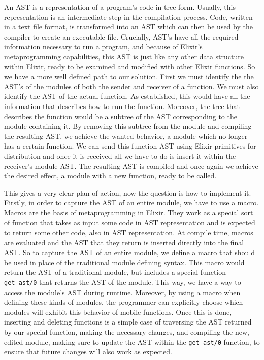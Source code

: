 An AST is a representation of a program's code in tree form. Usually, this representation is an intermediate step in the compilation process. Code, written in a text file format, is transformed into an AST which can then be used by the compiler to create an executable file. Crucially, AST's have all the required information necessary to run a program, and because of Elixir's metaprogramming capabilities, this AST is just like any other data structure within Elixir, ready to be examined and modified with other Elixir functions. So we have a more well defined path to our solution. First we must identify the the AST's of the modules of both the sender and receiver of a function. We must also identify the AST of the actual function. As established, this would have all the information that describes how to run the function. Moreover, the tree that describes the function would be a subtree of the AST corresponding to the module containing it. By removing this subtree from the module and compiling the resulting AST, we achieve the wanted behavior, a module which no longer has a certain function. We can send this function AST using Elixir primitives for distribution and once it is received all we have to do is insert it within the receiver's module AST. The resulting AST is compiled and once again we achieve the desired effect, a module with a new function, ready to be called.

This gives a very clear plan of action, now the question is how to implement it. Firstly, in order to capture the AST of an entire module, we have to use a macro. Macros are the basis of metaprogramming in Elixir. They work as a special sort of function that takes as input some code in AST representation and is expected to return some other code, also in AST representation. At compile time, macros are evaluated and the AST that they return is inserted directly into the final AST. So to capture the AST of an entire module, we define a macro that should be used in place of the traditional module defining syntax. This macro would return the AST of a traditional module, but includes a special function \lstinline{get_ast/0} that returns the AST of the module. This way, we have a way to access the module's AST during runtime. Moreover, by using a macro when defining these kinds of modules, the programmer can explicitly choose which modules will exhibit this behavior of mobile functions. Once this is done, inserting and deleting functions is a simple case of traversing the AST returned by our special function, making the necessary changes, and compiling the new, edited module, making sure to update the AST within the \lstinline{get_ast/0} function, to ensure that future changes will also work as expected.

